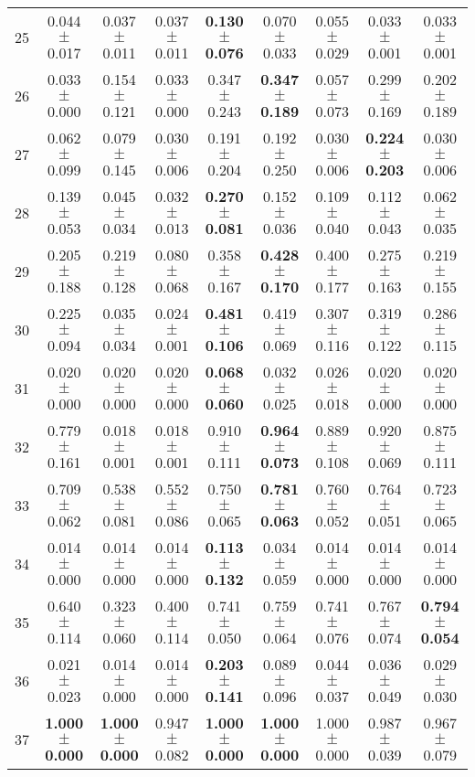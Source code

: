 \begin{table}[!ht]
{\begin{tabular}{r c c c c c c c c}
25 & 0.044 $\pm$ 0.017 & 0.037 $\pm$ 0.011 & 0.037 $\pm$ 0.011 & \textbf{0.130 $\pm$ 0.076} & 0.070 $\pm$ 0.033 & 0.055 $\pm$ 0.029 & 0.033 $\pm$ 0.001 & 0.033 $\pm$ 0.001 \\
26 & 0.033 $\pm$ 0.000 & 0.154 $\pm$ 0.121 & 0.033 $\pm$ 0.000 & 0.347 $\pm$ 0.243 & \textbf{0.347 $\pm$ 0.189} & 0.057 $\pm$ 0.073 & 0.299 $\pm$ 0.169 & 0.202 $\pm$ 0.189 \\
27 & 0.062 $\pm$ 0.099 & 0.079 $\pm$ 0.145 & 0.030 $\pm$ 0.006 & 0.191 $\pm$ 0.204 & 0.192 $\pm$ 0.250 & 0.030 $\pm$ 0.006 & \textbf{0.224 $\pm$ 0.203} & 0.030 $\pm$ 0.006 \\
28 & 0.139 $\pm$ 0.053 & 0.045 $\pm$ 0.034 & 0.032 $\pm$ 0.013 & \textbf{0.270 $\pm$ 0.081} & 0.152 $\pm$ 0.036 & 0.109 $\pm$ 0.040 & 0.112 $\pm$ 0.043 & 0.062 $\pm$ 0.035 \\
29 & 0.205 $\pm$ 0.188 & 0.219 $\pm$ 0.128 & 0.080 $\pm$ 0.068 & 0.358 $\pm$ 0.167 & \textbf{0.428 $\pm$ 0.170} & 0.400 $\pm$ 0.177 & 0.275 $\pm$ 0.163 & 0.219 $\pm$ 0.155 \\
30 & 0.225 $\pm$ 0.094 & 0.035 $\pm$ 0.034 & 0.024 $\pm$ 0.001 & \textbf{0.481 $\pm$ 0.106} & 0.419 $\pm$ 0.069 & 0.307 $\pm$ 0.116 & 0.319 $\pm$ 0.122 & 0.286 $\pm$ 0.115 \\
31 & 0.020 $\pm$ 0.000 & 0.020 $\pm$ 0.000 & 0.020 $\pm$ 0.000 & \textbf{0.068 $\pm$ 0.060} & 0.032 $\pm$ 0.025 & 0.026 $\pm$ 0.018 & 0.020 $\pm$ 0.000 & 0.020 $\pm$ 0.000 \\
32 & 0.779 $\pm$ 0.161 & 0.018 $\pm$ 0.001 & 0.018 $\pm$ 0.001 & 0.910 $\pm$ 0.111 & \textbf{0.964 $\pm$ 0.073} & 0.889 $\pm$ 0.108 & 0.920 $\pm$ 0.069 & 0.875 $\pm$ 0.111 \\
33 & 0.709 $\pm$ 0.062 & 0.538 $\pm$ 0.081 & 0.552 $\pm$ 0.086 & 0.750 $\pm$ 0.065 & \textbf{0.781 $\pm$ 0.063} & 0.760 $\pm$ 0.052 & 0.764 $\pm$ 0.051 & 0.723 $\pm$ 0.065 \\
34 & 0.014 $\pm$ 0.000 & 0.014 $\pm$ 0.000 & 0.014 $\pm$ 0.000 & \textbf{0.113 $\pm$ 0.132} & 0.034 $\pm$ 0.059 & 0.014 $\pm$ 0.000 & 0.014 $\pm$ 0.000 & 0.014 $\pm$ 0.000 \\
35 & 0.640 $\pm$ 0.114 & 0.323 $\pm$ 0.060 & 0.400 $\pm$ 0.114 & 0.741 $\pm$ 0.050 & 0.759 $\pm$ 0.064 & 0.741 $\pm$ 0.076 & 0.767 $\pm$ 0.074 & \textbf{0.794 $\pm$ 0.054} \\
36 & 0.021 $\pm$ 0.023 & 0.014 $\pm$ 0.000 & 0.014 $\pm$ 0.000 & \textbf{0.203 $\pm$ 0.141} & 0.089 $\pm$ 0.096 & 0.044 $\pm$ 0.037 & 0.036 $\pm$ 0.049 & 0.029 $\pm$ 0.030 \\
37 & \textbf{1.000 $\pm$ 0.000} & \textbf{1.000 $\pm$ 0.000} & 0.947 $\pm$ 0.082 & \textbf{1.000 $\pm$ 0.000} & \textbf{1.000 $\pm$ 0.000} & 1.000 $\pm$ 0.000 & 0.987 $\pm$ 0.039 & 0.967 $\pm$ 0.079 \\

\end{tabular}}
\end{table}
